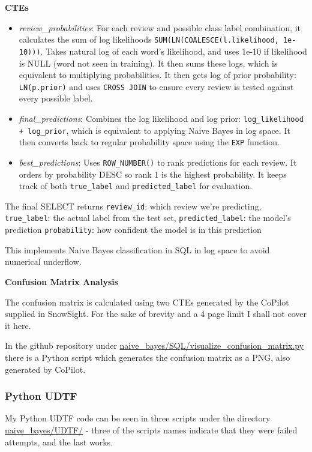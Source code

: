 \documentclass{article}
\begin{document}
\medskip \noindent \textbf{CTEs}
\begin{itemize}
    \item \textit{review\_probabilities}: For each review and possible class label combination, it calculates the sum of log likelihoods \texttt{SUM(LN(COALESCE(l.likelihood, 1e-10)))}. Takes natural log of each word's likelihood, and uses 1e-10 if likelihood is NULL (word not seen in training). It then sums these logs, which is equivalent to multiplying probabilities. It then gets log of prior probability: \texttt{LN(p.prior)} and uses \texttt{CROSS JOIN} to ensure every review is tested against every possible label.
    
    \item \textit{final\_predictions}: Combines the log likelihood and log prior: \texttt{log\_likelihood + log\_prior}, which is equivalent to applying Naive Bayes in log space. It then converts back to regular probability space using the \texttt{EXP} function. 
    
    \item \textit{best\_predictions}: Uses \texttt{ROW\_NUMBER()} to rank predictions for each review. It orders by probability DESC so rank 1 is the highest probability. It keeps track of both \texttt{true\_label} and \texttt{predicted\_label} for evaluation.
\end{itemize}

\medskip \noindent The final SELECT returns \texttt{review\_id}: which review we're predicting, \texttt{true\_label}: the actual label from the test set, \texttt{predicted\_label}: the model's prediction \texttt{probability}: how confident the model is in this prediction

\medskip \noindent This implements Naive Bayes classification in SQL in log space to avoid numerical underflow.

\medskip \noindent \textbf{Confusion Matrix Analysis}

\noindent The confusion matrix is calculated using two CTEs generated by the CoPilot supplied in SnowSight. For the sake of brevity and a 4 page limit I shall not cover it here. 

\medskip \noindent In the github repository under \url{naive_bayes/SQL/visualize_confusion_matrix.py} there is a Python script which generates the confusion matrix as a PNG, also generated by CoPilot.
 
\subsubsection{Python UDTF}
My Python UDTF code can be seen in three scripts under the directory \url{naive_bayes/UDTF/} - three of the scripts names indicate that they were failed attempts, and the last works. 
\end{document}
